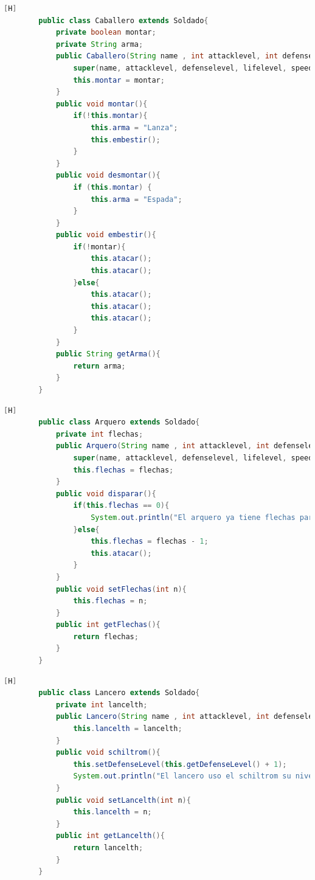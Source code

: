 \documentclass{article}
\begin{document}
	\begin{lstlisting}[language=java,caption={Las lineas de codigos de la clase Caballero creada:}][H]
		public class Caballero extends Soldado{
			private boolean montar;
			private String arma;
			public Caballero(String name , int attacklevel, int defenselevel, int lifelevel, int speed, String attitude ,boolean lives, int row, String column,boolean montar){
				super(name, attacklevel, defenselevel, lifelevel, speed, attitude, lives, row, column);
				this.montar = montar;
			}
			public void montar(){
				if(!this.montar){
					this.arma = "Lanza";
					this.embestir();
				}
			}
			public void desmontar(){
				if (this.montar) {
					this.arma = "Espada";
				}
			}
			public void embestir(){
				if(!montar){
					this.atacar();
					this.atacar();
				}else{
					this.atacar();
					this.atacar();
					this.atacar();
				}
			}
			public String getArma(){
				return arma;
			}
		}
	\end{lstlisting}
	\begin{lstlisting}[language=java,caption={Las lineas de codigos de la clase Arquero creada:}][H]
		public class Arquero extends Soldado{
			private int flechas;
			public Arquero(String name , int attacklevel, int defenselevel, int lifelevel, int speed, String attitude ,boolean lives, int row, String column, int flechas){
				super(name, attacklevel, defenselevel, lifelevel, speed, attitude, lives, row, column);
				this.flechas = flechas;
			}
			public void disparar(){
				if(this.flechas == 0){
					System.out.println("El arquero ya tiene flechas para poder disparar");
				}else{
					this.flechas = flechas - 1;
					this.atacar();
				}
			}
			public void setFlechas(int n){
				this.flechas = n;
			}
			public int getFlechas(){
				return flechas;
			}
		}
	\end{lstlisting}
	\begin{lstlisting}[language=java,caption={Las lineas de codigos de la clase Lancero creada:}][H]
		public class Lancero extends Soldado{
			private int lancelth;
			public Lancero(String name , int attacklevel, int defenselevel, int lifelevel, int speed, String attitude ,boolean lives, int row, String column, int lancelth){
				this.lancelth = lancelth;
			}
			public void schiltrom(){
				this.setDefenseLevel(this.getDefenseLevel() + 1);
				System.out.println("El lancero uso el schiltrom su nivel de defensa subio 1 punto");
			}
			public void setLancelth(int n){
				this.lancelth = n;
			}
			public int getLancelth(){
				return lancelth;
			}
		}
	\end{lstlisting}
\end{document}

